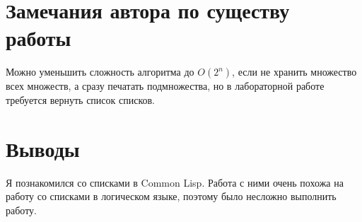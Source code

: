 \documentclass[12pt]{article}
\begin{document}
\section{Замечания автора по существу работы}

Можно уменьшить сложность алгоритма до $O(2 ^ n)$, если не хранить множество всех множеств, а сразу печатать подмножества, но в лабораторной работе требуется вернуть список списков.

\section{Выводы}
Я познакомился со списками в Common Lisp. Работа с ними очень похожа на работу со списками в логическом языке, поэтому было несложно выполнить работу.
\end{document}
